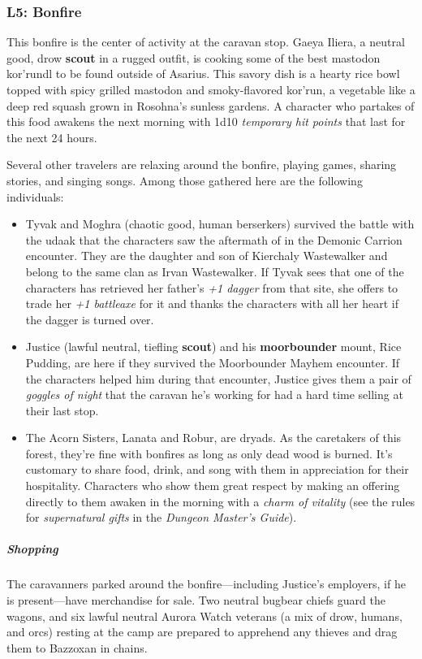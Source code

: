 \documentclass[10pt,a4paper,twoside,bg=print,twocolumn,openany,nodeprecatedcode]{dndbook}
\begin{document}
\subsubsection{L5: Bonfire}
This bonfire is the center of activity at the caravan stop. Gaeya Iliera, a neutral good, drow \textbf{scout} in a rugged outfit, is cooking some of the best mastodon kor'rundl to be found outside of Asarius. This savory dish is a hearty rice bowl topped with spicy grilled mastodon and smoky-flavored kor'run, a vegetable like a deep red squash grown in Rosohna's sunless gardens. A character who partakes of this food awakens the next morning with 1d10 \textit{temporary hit points} that last for the next 24 hours.

Several other travelers are relaxing around the bonfire, playing games, sharing stories, and singing songs. Among those gathered here are the following individuals:


\begin{itemize}
\item Tyvak and Moghra (chaotic good, human berserkers) survived the battle with the udaak that the characters saw the aftermath of in the Demonic Carrion encounter. They are the daughter and son of Kierchaly Wastewalker and belong to the same clan as Irvan Wastewalker. If Tyvak sees that one of the characters has retrieved her father's \textit{+1 dagger} from that site, she offers to trade her \textit{+1 battleaxe} for it and thanks the characters with all her heart if the dagger is turned over.
\item Justice (lawful neutral, tiefling \textbf{scout}) and his \textbf{moorbounder} mount, Rice Pudding, are here if they survived the Moorbounder Mayhem encounter. If the characters helped him during that encounter, Justice gives them a pair of \textit{goggles of night} that the caravan he's working for had a hard time selling at their last stop.
\item The Acorn Sisters, Lanata and Robur, are dryads. As the caretakers of this forest, they're fine with bonfires as long as only dead wood is burned. It's customary to share food, drink, and song with them in appreciation for their hospitality. Characters who show them great respect by making an offering directly to them awaken in the morning with a \textit{charm of vitality} (see the rules for \textit{supernatural gifts} in the \textit{Dungeon Master's Guide}).
\end{itemize}

\subparagraph{Shopping}
The caravanners parked around the bonfire—including Justice's employers, if he is present—have merchandise for sale. Two neutral bugbear chiefs guard the wagons, and six lawful neutral Aurora Watch veterans (a mix of drow, humans, and orcs) resting at the camp are prepared to apprehend any thieves and drag them to Bazzoxan in chains.
\end{document}
